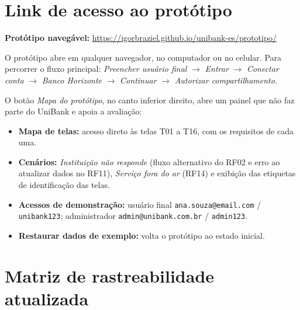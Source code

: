 \documentclass[11pt,a4paper]{article}
\newcommand{\cls}[1]{\texttt{#1}}
\newcommand{\protolink}{https://igorbraziel.github.io/unibank-es/prototipo/}
\begin{document}
\section{Link de acesso ao protótipo}
\label{sec:link}

\textbf{Protótipo navegável:} \url{\protolink}

O protótipo abre em qualquer navegador, no computador ou no celular. Para percorrer o fluxo principal: \emph{Preencher usuário final} $\rightarrow$ \emph{Entrar} $\rightarrow$ \emph{Conectar conta} $\rightarrow$ \emph{Banco Horizonte} $\rightarrow$ \emph{Continuar} $\rightarrow$ \emph{Autorizar compartilhamento}.

O botão \emph{Mapa do protótipo}, no canto inferior direito, abre um painel que não faz parte do UniBank e apoia a avaliação:

\begin{itemize}
\item \textbf{Mapa de telas:} acesso direto às telas T01 a T16, com os requisitos de cada uma.
\item \textbf{Cenários:} \emph{Instituição não responde} (fluxo alternativo do RF02 e erro ao atualizar dados no RF11), \emph{Serviço fora do ar} (RF14) e exibição das etiquetas de identificação das telas.
\item \textbf{Acessos de demonstração:} usuário final \cls{ana.souza@email.com} / \cls{unibank123}; administrador \cls{admin@unibank.com.br} / \cls{admin123}.
\item \textbf{Restaurar dados de exemplo:} volta o protótipo ao estado inicial.
\end{itemize}

\section{Matriz de rastreabilidade atualizada}
\end{document}
